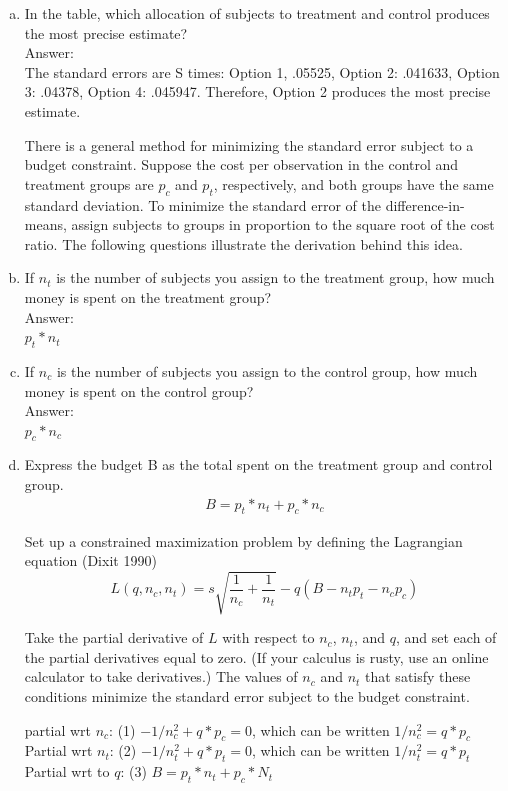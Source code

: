 \documentclass[11pt,notitlepage]{article}\usepackage[]{graphicx}\usepackage[]{color}
\begin{document}
\begin{enumerate}[a)]
\item In the table, which allocation of subjects to treatment and control produces the most precise estimate?\\
Answer:\\
The standard errors are S times:  Option 1, .05525, Option 2: .041633, Option 3: .04378, Option 4: .045947.  Therefore, Option 2 produces the most precise estimate.

There is a general method for minimizing the standard error subject to a budget constraint. Suppose the cost per observation in the control and treatment groups are $p_c$ and $p_t$, respectively, and both groups have the same standard deviation. To minimize the standard error of the difference-in-means, assign subjects to groups in proportion to the square root of the cost ratio. The following questions illustrate the derivation behind this idea.
\item If $n_t$ is the number of subjects you assign to the treatment group, how much money is spent on the treatment group? \\
Answer:\\
$p_t*n_t$

\item If $n_c$ is the number of subjects you assign to the control group, how much money is spent on the control group?\\
Answer:\\
$p_c*n_c$
\item Express the budget B as the total spent on the treatment group and control group.
\begin{align*}
B = p_t*n_t + p_c*n_c
\end{align*}

Set up a constrained maximization problem by defining the Lagrangian equation (Dixit 1990)
\begin{equation*}
L(q, n_c, n_t) = s \sqrt{\frac{1}{n_c} + \frac{1}{n_t}} - q(B - n_t p_t - n_c p_c)
\end{equation*}

Take the partial derivative of $L$ with respect to $n_c$, $n_t$, and $q$, and set each of the partial derivatives equal to zero. (If your calculus is rusty, use an online calculator to take derivatives.) The values of $n_c$ and $n_t$ that satisfy these conditions minimize the standard error subject to the budget constraint.

partial wrt $n_c$: 	(1)	$-1/n_c^2 + q*p_c=0$, which can be written $1/n_c^2 = q*p_c$
Partial wrt $n_t$: 	(2)	$-1/n_t^2 + q*p_t=0$, which can be written $1/n_t^2 = q*p_t$
Partial wrt to $q$: 	(3)		$B = p_t*n_t + p_c*N_t$



\end{enumerate}
\end{document}
